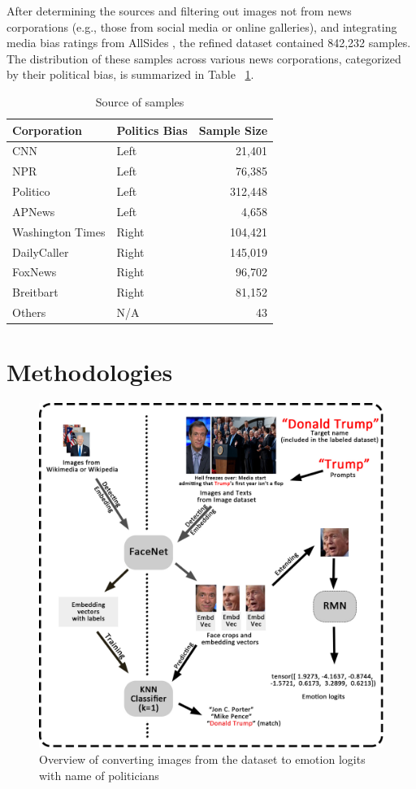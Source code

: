\documentclass[sigconf]{acmart}
\begin{document}
After determining the sources and filtering out images not from news corporations (e.g., those from social media or online galleries), and integrating media bias ratings from AllSides \cite{allsides2024}, the refined dataset contained 842,232 samples. The distribution of these samples across various news corporations, categorized by their political bias, is summarized in Table ~\ref{tab:source}.

\begin{table}[ht]
  \centering
  \renewcommand{\arraystretch}{1.2}
  \label{tab:politics_bias}
  \begin{tabular}{|l|l|r|}
    \hline
    \textbf{Corporation} & \textbf{Politics Bias} & \textbf{Sample Size} \\ \hline
    CNN & Left & 21,401 \\ \hline
    NPR & Left & 76,385 \\ \hline
    Politico & Left & 312,448 \\ \hline
    APNews & Left & 4,658 \\ \hline
    Washington Times & Right & 104,421 \\ \hline
    DailyCaller & Right & 145,019 \\ \hline
    FoxNews & Right & 96,702 \\ \hline
    Breitbart & Right & 81,152 \\ \hline
    Others & N/A & 43 \\ \hline
  \end{tabular}
  \caption{Source of samples}
  \label{tab:source}
\end{table}


\section{Methodologies}\label{sec:method}

\begin{figure}
    \centering
    \includegraphics[width=.5\textwidth]{assets/thesis.jpg}
    \caption{Overview of converting images from the dataset to emotion logits with name of politicians}
    \label{fig:overview}
    \vspace{10pt}
\end{figure}
\end{document}
